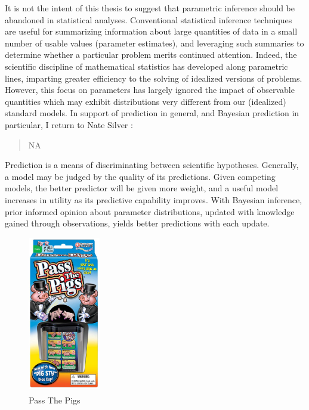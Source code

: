 \documentclass[12pt, a4paper]{article}
\begin{document}
\noindent It is not the intent of this thesis to suggest that parametric inference should be abandoned in statistical analyses.  Conventional statistical inference techniques are useful for summarizing information about large quantities of data in a small number of usable values (parameter estimates), and leveraging such summaries to determine whether a particular problem merits continued attention. Indeed, the scientific discipline of mathematical statistics has developed along parametric lines, imparting greater efficiency to the solving of idealized versions of problems. However, this focus on parameters has largely ignored the impact of observable quantities which may exhibit distributions very different from our (idealized) standard models. In support of prediction in general, and Bayesian prediction in particular, I return to Nate Silver :\\

\begin{quote}
NA
\end{quote}



\noindent Prediction is a means of discriminating between scientific hypotheses. Generally, a model may be judged by the quality of its predictions.  Given competing models, the better predictor will be given more weight, and a useful model increases in utility as its predictive capability improves.  With Bayesian inference, prior informed opinion about parameter distributions, updated with knowledge gained through observations, yields better predictions with each update.\\


\setlength{\intextsep}{20pt}
\begin{figure}
  \centering
    \includegraphics[width=0.28\textwidth]{./Graphics/PassThePigs/PtPBox}
  \caption{Pass The Pigs\textsuperscript{\circledR}}
\end{figure}
\end{document}
